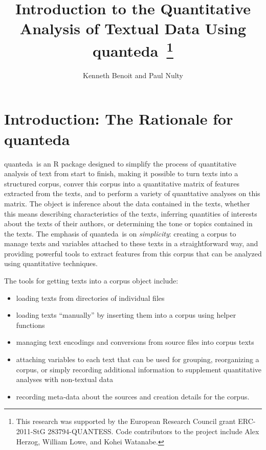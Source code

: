 \documentclass[11pt]{article}
\newcommand{\quanteda}{\textsf{quanteda}\ }
\begin{document}





\begin{Schunk}
\end{Schunk}

\title{Introduction to the Quantitative Analysis of Textual Data Using
  \quanteda\thanks{This research was supported by the European
    Research Council grant ERC-2011-StG 283794-QUANTESS.  Code
    contributors to the project include Alex Herzog, William Lowe, and
    Kohei Watanabe.}}

\author{Kenneth Benoit and Paul Nulty}

\maketitle

\setlength{\parskip}{1ex}
\setlength{\parindent}{0ex}

\section{Introduction: The Rationale for \quanteda}

\quanteda is an R package designed to simplify the process of
quantitative analysis of text from start to finish, making it possible
to turn texts into a structured corpus, conver this corpus into a
quantitative matrix of features extracted from the texts, and to
perform a variety of quanttative analyses on this matrix.  The object
is inference about the data contained in the texts, whether this means
describing characteristics of the texts, inferring quantities of
interests about the texts of their authors, or determining the tone or
topics contained in the texts.  The emphasis of \quanteda is on
\emph{simplicity}: creating a corpus to manage texts and variables
attached to these texts in a straightforward way, and providing
powerful tools to extract features from this corpus that can be
analyzed using quantitative techniques.

The tools for getting texts into a corpus object include: 
\begin{itemize}
\item loading texts from directories of individual files
\item loading texts ``manually'' by inserting them into a corpus using
  helper functions
\item managing text encodings and conversions from source files into
  corpus texts
\item attaching variables to each text that can be used for grouping,
  reorganizing a corpus, or simply recording additional information to
  supplement quantitative analyses with non-textual data
\item recording meta-data about the sources and creation details for
  the corpus.
\end{itemize}
\end{document}
